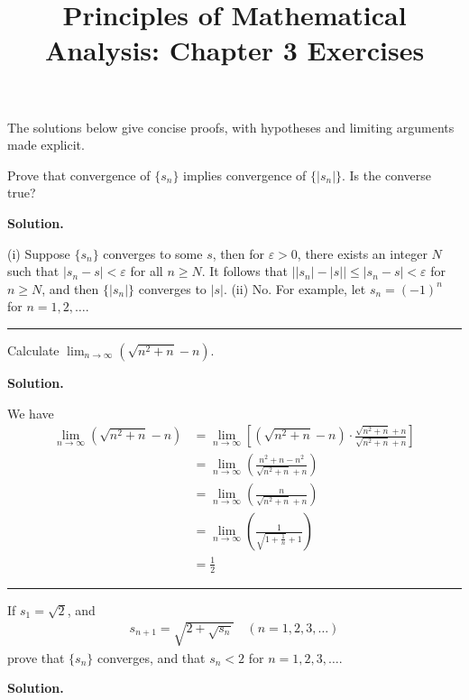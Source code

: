 \documentclass[12pt]{article}
\title{Principles of Mathematical Analysis: Chapter 3 Exercises}
\date{}
\theoremstyle{definition}
\begin{document}
\maketitle
\noindent The solutions below give concise proofs, with hypotheses and limiting arguments made explicit.

Prove that convergence of $\{s_n\}$ implies convergence of $\{\left\vert s_n\right\vert\}$. Is the converse true?

\smallskip
\noindent\textbf{Solution.}\quad

(i) Suppose $\{s_n\}$ converges to some $s$, then for $\varepsilon>0$, there exists an integer $N$ such that  $\left\vert s_n-s\right\vert<\varepsilon$ for all $n\ge N$. It follows that $\left\vert\left\vert s_n\right\vert-\left\vert s\right\vert\right\vert\le \left\vert s_n-s\right\vert<\varepsilon$ for $n\ge N$, and then $\{\left\vert s_n\right\vert\}$ converges to $\left\vert s\right\vert$.
(ii) No. For example, let $s_n=(-1)^n$ for $n=1,2,\ldots$.



\bigskip\noindent\hrule\bigskip

Calculate $\lim_{n\to\infty}\left(\sqrt{n^2+n}-n\right)$.

\smallskip
\noindent\textbf{Solution.}\quad

We have
\begin{align*}
\lim_{n\to\infty}\left(\sqrt{n^2+n}-n\right)
&=\lim_{n\to\infty}\left[\left(\sqrt{n^2+n}-n\right)\cdot
\frac{\sqrt{n^2+n}+n}{\sqrt{n^2+n}+n}\right]\\
&=\lim_{n\to\infty}\left(\frac{n^2+n-n^2}{\sqrt{n^2+n}+n}\right)\\
&=\lim_{n\to\infty}\left(\frac{n}{\sqrt{n^2+n}+n}\right)\\
&=\lim_{n\to\infty}\left(\frac{1}{\sqrt{1+\frac{1}{n}}+1}\right)\\
&=\frac{1}{2}
\end{align*}



\bigskip\noindent\hrule\bigskip

If $s_1=\sqrt{2}$, and
\begin{align*}
s_{n+1}=\sqrt{2+\sqrt{s_{n}}}\quad(n=1,2,3,\ldots)
\end{align*}
prove that $\{s_n\}$ converges, and that $s_n<2$ for $n=1,2,3,\ldots$.

\smallskip
\noindent\textbf{Solution.}\quad
\end{document}
